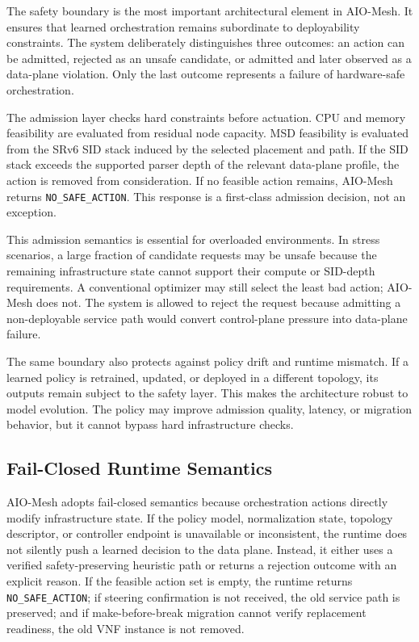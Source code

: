 \documentclass[final,5p]{elsarticle}
\begin{document}
The safety boundary is the most important architectural element in AIO-Mesh. It ensures that learned orchestration remains subordinate to deployability constraints. The system deliberately distinguishes three outcomes: an action can be admitted, rejected as an unsafe candidate, or admitted and later observed as a data-plane violation. Only the last outcome represents a failure of hardware-safe orchestration.

The admission layer checks hard constraints before actuation. CPU and memory feasibility are evaluated from residual node capacity. MSD feasibility is evaluated from the SRv6 SID stack induced by the selected placement and path. If the SID stack exceeds the supported parser depth of the relevant data-plane profile, the action is removed from consideration. If no feasible action remains, AIO-Mesh returns \texttt{NO\_SAFE\_ACTION}. This response is a first-class admission decision, not an exception.

This admission semantics is essential for overloaded environments. In stress scenarios, a large fraction of candidate requests may be unsafe because the remaining infrastructure state cannot support their compute or SID-depth requirements. A conventional optimizer may still select the least bad action; AIO-Mesh does not. The system is allowed to reject the request because admitting a non-deployable service path would convert control-plane pressure into data-plane failure.

The same boundary also protects against policy drift and runtime mismatch. If a learned policy is retrained, updated, or deployed in a different topology, its outputs remain subject to the safety layer. This makes the architecture robust to model evolution. The policy may improve admission quality, latency, or migration behavior, but it cannot bypass hard infrastructure checks.

\subsection{Fail-Closed Runtime Semantics}
\label{subsec:fail_closed_semantics}

AIO-Mesh adopts fail-closed semantics because orchestration actions directly modify infrastructure state. If the policy model, normalization state, topology descriptor, or controller endpoint is unavailable or inconsistent, the runtime does not silently push a learned decision to the data plane. Instead, it either uses a verified safety-preserving heuristic path or returns a rejection outcome with an explicit reason. If the feasible action set is empty, the runtime returns \texttt{NO\_SAFE\_ACTION}; if steering confirmation is not received, the old service path is preserved; and if make-before-break migration cannot verify replacement readiness, the old VNF instance is not removed.
\end{document}
